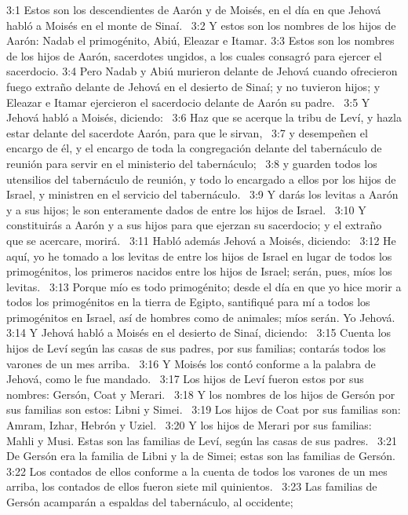 3:1 Estos son los descendientes de Aarón y de Moisés, en el día en que Jehová habló a Moisés en el monte de Sinaí.  
3:2 Y estos son los nombres de los hijos de Aarón: Nadab el primogénito, Abiú, Eleazar e Itamar. 
3:3 Estos son los nombres de los hijos de Aarón, sacerdotes ungidos, a los cuales consagró para ejercer el sacerdocio. 
3:4 Pero Nadab y Abiú murieron delante de Jehová cuando ofrecieron fuego extraño delante de Jehová en el desierto de Sinaí; y no tuvieron hijos; y Eleazar e Itamar ejercieron el sacerdocio delante de Aarón su padre.  
3:5 Y Jehová habló a Moisés, diciendo:  
3:6 Haz que se acerque la tribu de Leví, y hazla estar delante del sacerdote Aarón, para que le sirvan,  
3:7 y desempeñen el encargo de él, y el encargo de toda la congregación delante del tabernáculo de reunión para servir en el ministerio del tabernáculo;  
3:8 y guarden todos los utensilios del tabernáculo de reunión, y todo lo encargado a ellos por los hijos de Israel, y ministren en el servicio del tabernáculo.  
3:9 Y darás los levitas a Aarón y a sus hijos; le son enteramente dados de entre los hijos de Israel.  
3:10 Y constituirás a Aarón y a sus hijos para que ejerzan su sacerdocio; y el extraño que se acercare, morirá.  
3:11 Habló además Jehová a Moisés, diciendo:  
3:12 He aquí, yo he tomado a los levitas de entre los hijos de Israel en lugar de todos los primogénitos, los primeros nacidos entre los hijos de Israel; serán, pues, míos los levitas.  
3:13 Porque mío es todo primogénito; desde el día en que yo hice morir a todos los primogénitos en la tierra de Egipto, santifiqué para mí a todos los primogénitos en Israel, así de hombres como de animales; míos serán. Yo Jehová.  
3:14 Y Jehová habló a Moisés en el desierto de Sinaí, diciendo:  
3:15 Cuenta los hijos de Leví según las casas de sus padres, por sus familias; contarás todos los varones de un mes arriba.  
3:16 Y Moisés los contó conforme a la palabra de Jehová, como le fue mandado.  
3:17 Los hijos de Leví fueron estos por sus nombres: Gersón, Coat y Merari.  
3:18 Y los nombres de los hijos de Gersón por sus familias son estos: Libni y Simei.  
3:19 Los hijos de Coat por sus familias son: Amram, Izhar, Hebrón y Uziel.  
3:20 Y los hijos de Merari por sus familias: Mahli y Musi. Estas son las familias de Leví, según las casas de sus padres.  
3:21 De Gersón era la familia de Libni y la de Simei; estas son las familias de Gersón.  
3:22 Los contados de ellos conforme a la cuenta de todos los varones de un mes arriba, los contados de ellos fueron siete mil quinientos.  
3:23 Las familias de Gersón acamparán a espaldas del tabernáculo, al occidente;  
